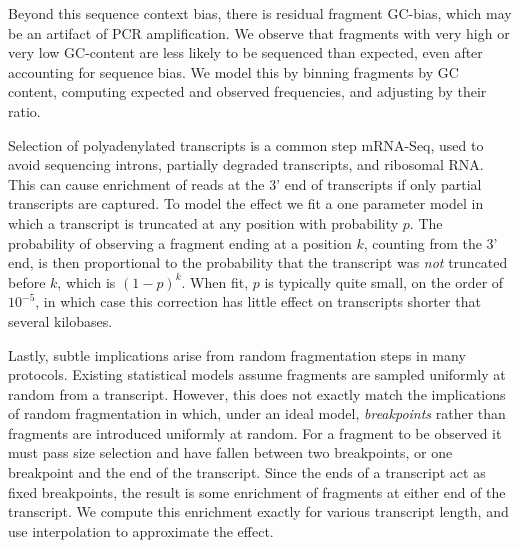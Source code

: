 \documentclass[twocolumn]{article}
\begin{document}
Beyond this sequence context bias, there is residual fragment GC-bias,
which may be an artifact of PCR amplification. We observe that fragments
with very high or very low GC-content are less likely to be sequenced
than expected, even after accounting for sequence bias. We model this by
binning fragments by GC content, computing expected and observed
frequencies, and adjusting by their ratio.

Selection of polyadenylated transcripts is a common step mRNA-Seq, used to avoid
sequencing introns, partially degraded transcripts, and ribosomal RNA. This can
cause enrichment of reads at the 3' end of transcripts if only partial
transcripts are captured. To model the effect we fit a one parameter model in
which a transcript is truncated at any position with probability $p$. The
probability of observing a fragment ending at a position $k$, counting from the
3' end, is then proportional to the probability that the transcript was
\emph{not} truncated before $k$, which is $(1-p)^{k}$.  When fit, $p$ is
typically quite small, on the order of $10^{-5}$, in which case this correction
has little effect on transcripts shorter that several kilobases.

Lastly, subtle implications arise from random fragmentation steps in many
protocols. Existing statistical models assume fragments are sampled uniformly
at random from a transcript. However, this does not exactly match the
implications of random fragmentation in which, under an ideal model,
\emph{breakpoints} rather than fragments are introduced uniformly at random. For
a fragment to be observed it must pass size selection and have fallen between
two breakpoints, or one breakpoint and the end of the transcript. Since the ends
of a transcript act as fixed breakpoints, the result is some enrichment of
fragments at either end of the transcript. We compute this enrichment exactly
for various transcript length, and use interpolation to approximate the effect.



\end{document}
